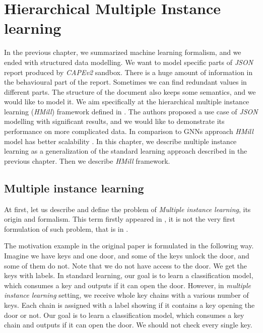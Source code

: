 \chapter{Hierarchical Multiple Instance learning} \label{chap:hmill}
In the previous chapter, we summarized machine learning formalism, and we ended with structured data modelling. We want to model specific parts of \emph{JSON} report produced by \emph{CAPEv2} sandbox. There is a huge amount of information in the behavioural part of the report. Sometimes we can find redundant values in different parts. The structure of the document also keeps some semantics, and we would like to model it. We aim specifically at the hierarchical multiple instance learning (\emph{HMill}) framework defined in \cite{Mandlik2020}. The authors proposed a use case of \emph{JSON} modelling with significant results, and we would like to demonstrate its performance on more complicated data. In comparison to GNNs approach \emph{HMill} model has better scalability \cite{Mandlik2020}.  In this chapter, we describe multiple instance learning as a generalization of the standard learning approach described in the previous chapter. Then we describe \emph{HMill} framework.


\section{Multiple instance learning}
At first, let us describe and define the problem of \emph{Multiple instance learning}, its origin and formalism. This term firstly appeared in \citet{Dietterich1997}, it is not the very first formulation of such problem, that is in \cite{Keeler1991}.

The motivation example in the original paper \cite{Dietterich1997} is formulated in the following way. Imagine we have keys and one door, and some of the keys unlock the door, and some of them do not. Note that we do not have access to the door. We get the keys with labels. In standard learning, our goal is to learn a classification model, which consumes a key and outputs if it can open the door. However, in \emph{multiple instance learning} setting, we receive whole key chains with a various number of keys. Each chain is assigned with a label showing if it contains a key opening the door or not. Our goal is to learn a classification model, which consumes a key chain and outputs if it can open the door. We should not check every single key.

